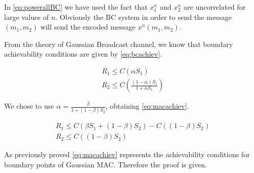In \eqref{eq:powerallBC} we have used the fact that $x_1^n$ and $x_2^n$ are uncorrelated for large values of $n$. Obviously the BC system in order to send the message $(m_1,m_2)$ will send the encoded message $x^n(m_1,m_2)$.

From the theory of Gaussian Broadcast channel, we know that boundary achievability conditions are given by \eqref{eq:bcachiev}.

\begin{equation}
\begin{gathered}
	R_1 \leq C(\alpha S_1) \\
	R_2  \leq C \left( \frac{(1-\alpha )S_1} {1+\alpha S_1} \right)
\end{gathered}
\label{eq:bcachiev}
\end{equation}

We chose to use $\alpha = \frac{\beta}{1+ (1-\beta) S_2}$, obtaining \eqref{eq:macachiev}.

\begin{equation}
\begin{gathered}
	R_1 \leq C (\beta S_1 + (1-\beta)S_2) - C((1-\beta)S_2) \\
	R_2  \leq   C \left( (1-\beta)S_2 \right)
\end{gathered}
\label{eq:macachiev}
\end{equation}

As previously proved \eqref{eq:macachiev} represents the achievability conditions for boundary points of Gaussian MAC. Therefore the proof is given.
